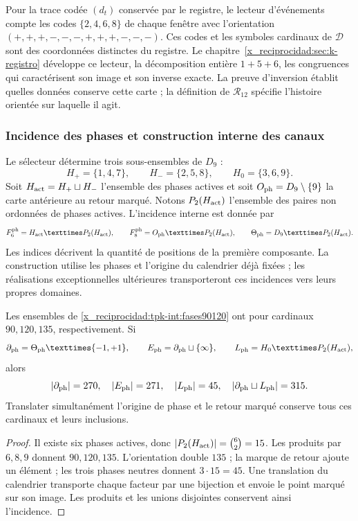 Pour la trace codée \((d_t)\) conservée par le registre, le lecteur d'événements compte les codes \(\{2,4,6,8\}\) de chaque fenêtre avec l'orientation \((+,+,+,-,-,-,+,+,+,-,-,-)\). Ces codes et les symboles cardinaux de \(\mathcal D\) sont des coordonnées distinctes du registre. Le chapitre~\ref{x_reciprocidad:sec:k-registro} développe ce lecteur, la décomposition entière \(1+5+6\), les congruences qui caractérisent son image et son inverse exacte. La preuve d'inversion établit quelles données conserve cette carte ; la définition de \(\mathcal R_{12}\) spécifie l'histoire orientée sur laquelle il agit.

\subsubsection{Incidence des phases et construction interne des canaux}
\label{x_reciprocidad:tpk-int:incidencia}

Le sélecteur détermine trois sous-ensembles de \(D_9\) :
\[
 H_+=\{1,4,7\},\qquad H_-=\{2,5,8\},\qquad H_0=\{3,6,9\}.
\]
Soit \(H_{\rm act}=H_+\sqcup H_-\) l'ensemble des phases actives et
soit \(O_{\rm ph}=D_9\setminus\{9\}\) la carte antérieure au retour
marqué. Notons \(P_2(H_{\rm act})\) l'ensemble des paires
non ordonnées de phases actives. L'incidence interne est donnée par
\begin{equation}
 \mathcal F^{\rm ph}_6=H_{\rm act}\times P_2(H_{\rm act}),\qquad
 \mathcal F^{\rm ph}_8=O_{\rm ph}\times P_2(H_{\rm act}),\qquad
 \Theta_{\rm ph}=D_9\times P_2(H_{\rm act}).
 \label{x_reciprocidad:tpk-int:fases90120}
\end{equation}
Les indices décrivent la quantité de positions de la première composante.
La construction utilise les phases et l'origine du calendrier déjà fixées ;
les réalisations exceptionnelles ultérieures transporteront ces
incidences vers leurs propres domaines.

\begin{proposition}
\label{x_reciprocidad:tpk-int:cardinales}
Les ensembles de \eqref{x_reciprocidad:tpk-int:fases90120} ont pour cardinaux \(90,120,135\), respectivement. Si
\[
 \partial_{\rm ph}=\Theta_{\rm ph}\times\{-1,+1\},\qquad
 E_{\rm ph}=\partial_{\rm ph}\sqcup\{\infty\},\qquad
 L_{\rm ph}=H_0\times P_2(H_{\rm act}),
\]
alors
\[
 |\partial_{\rm ph}|=270,\quad |E_{\rm ph}|=271,\quad
 |L_{\rm ph}|=45,\quad
 |\partial_{\rm ph}\sqcup L_{\rm ph}|=315.
\]
Translater simultanément l'origine de phase et le retour marqué conserve
tous ces cardinaux et leurs inclusions.
\end{proposition}
\begin{proof}
Il existe six phases actives, donc
\(|P_2(H_{\rm act})|=\binom62=15\). Les produits par
\(6,8,9\) donnent \(90,120,135\). L'orientation double \(135\) ;
la marque de retour ajoute un élément ; les trois phases neutres donnent
\(3\cdot15=45\). Une translation du calendrier transporte chaque
facteur par une bijection et envoie le point marqué sur son image. Les
produits et les unions disjointes conservent ainsi l'incidence.
\end{proof}

